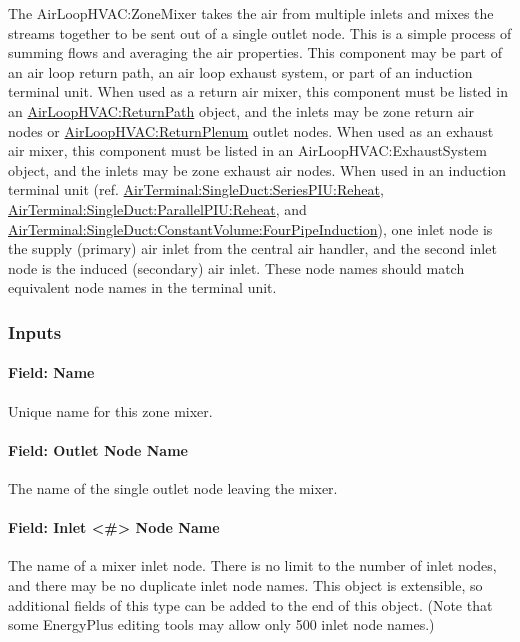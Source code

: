 The AirLoopHVAC:ZoneMixer takes the air from multiple inlets and mixes the streams together to be sent out of a single outlet node. This is a simple process of summing flows and averaging the air properties. This component may be part of an air loop return path, an air loop exhaust system, or part of an induction terminal unit. When used as a return air mixer, this component must be listed in an \hyperref[airloophvacreturnpath]{AirLoopHVAC:ReturnPath} object, and the inlets may be zone return air nodes or \hyperref[airloophvacreturnplenum]{AirLoopHVAC:ReturnPlenum} outlet nodes. When used as an exhaust air mixer, this component must be listed in an AirLoopHVAC:ExhaustSystem object, and the inlets may be zone exhaust air nodes. When used in an induction terminal unit (ref. \hyperref[airterminalsingleductseriespiureheat]{AirTerminal:SingleDuct:SeriesPIU:Reheat}, \hyperref[airterminalsingleductparallelpiureheat]{AirTerminal:SingleDuct:ParallelPIU:Reheat}, and \hyperref[airterminalsingleductconstantvolumefourpipeinduction]{AirTerminal:SingleDuct:ConstantVolume:FourPipeInduction}), one inlet node is the supply (primary) air inlet from the central air handler, and the second inlet node is the induced (secondary) air inlet. These node names should match equivalent node names in the terminal unit.

\subsubsection{Inputs}

\paragraph{Field: Name}

Unique name for this zone mixer.

\paragraph{Field: Outlet Node Name}

The name of the single outlet node leaving the mixer.

\paragraph{Field: Inlet \textless{}\#\textgreater{} Node Name}

The name of a mixer inlet node. There is no limit to the number of inlet nodes, and there may be no duplicate inlet node names.  This object is extensible, so additional fields of this type can be added to the end of this object.  (Note that some EnergyPlus editing tools may allow only 500 inlet node names.)

